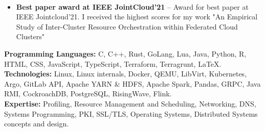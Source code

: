 \documentclass[10pt,a4paper]{base}
\begin{document}
\begin{fullwidth}
 \\

\begin{itemize}
  \item \textbf{Best paper award at IEEE JointCloud'21} -- Award for best paper at IEEE Jointcloud'21. I received the highest scores for my work "An Empirical Study of Inter-Cluster Resource Orchestration within Federated Cloud Clusters"
\end{itemize}


\textbf{Programming Languages:} C, C++, Rust, GoLang, Lua, Java, Python, R, HTML, CSS, JavaScript, TypeScript, Terraform, Terragrunt, \LaTeX. \\
\textbf{Technologies:} Linux, Linux internals, Docker, QEMU, LibVirt, Kubernetes, Argo, GitLab API, Apache YARN \& HDFS, Apache Spark, Pandas, GRPC, Java RMI, CockroachDB, PostgreSQL, RisingWave, Flink.\\
\textbf{Expertise:} Profiling, Resource Management and Scheduling, Networking, DNS, Systems Programming, PKI, SSL/TLS, Operating Systems, Distributed Systems concepts and design. \\

\end{fullwidth}
\end{document}

